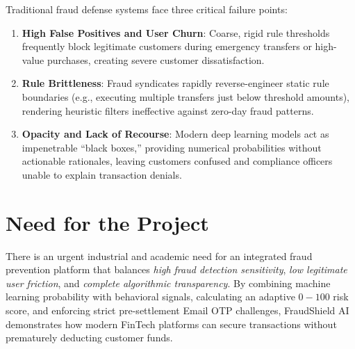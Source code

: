 Traditional fraud defense systems face three critical failure points:
\begin{enumerate}[label=\arabic*.]
    \item \textbf{High False Positives and User Churn}: Coarse, rigid rule thresholds frequently block legitimate customers during emergency transfers or high-value purchases, creating severe customer dissatisfaction.
    \item \textbf{Rule Brittleness}: Fraud syndicates rapidly reverse-engineer static rule boundaries (e.g., executing multiple transfers just below threshold amounts), rendering heuristic filters ineffective against zero-day fraud patterns.
    \item \textbf{Opacity and Lack of Recourse}: Modern deep learning models act as impenetrable ``black boxes,'' providing numerical probabilities without actionable rationales, leaving customers confused and compliance officers unable to explain transaction denials.
\end{enumerate}

\section{Need for the Project}
There is an urgent industrial and academic need for an integrated fraud prevention platform that balances \textit{high fraud detection sensitivity}, \textit{low legitimate user friction}, and \textit{complete algorithmic transparency}. By combining machine learning probability with behavioral signals, calculating an adaptive $0-100$ risk score, and enforcing strict pre-settlement Email OTP challenges, FraudShield AI demonstrates how modern FinTech platforms can secure transactions without prematurely deducting customer funds.

